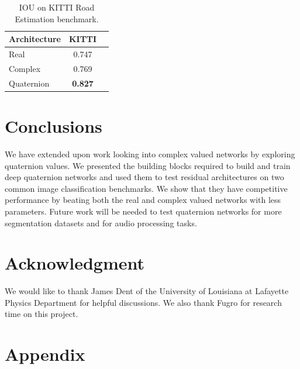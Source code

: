 \documentclass[conference]{IEEEtran}
\begin{document}
\begin{table}[h]
	\centering
		\begin{tabular}{l c c}
			\hline
			Architecture & KITTI \\
			\hline
			Real & 0.747 \\
			Complex & 0.769 \\
			Quaternion & \textbf{0.827}
		\end{tabular}
	\caption{IOU on KITTI Road Estimation benchmark.}
	\label{t:results2}
\end{table}


\section{Conclusions}
We have extended upon work looking into complex valued networks by exploring quaternion values.
We presented the building blocks required to build and train deep quaternion networks and used them to test residual architectures on two common image classification benchmarks.
We show that they have competitive performance by beating both the real and complex valued networks with less parameters.
Future work will be needed to test quaternion networks for more segmentation datasets and for audio processing tasks.


\section{Acknowledgment}
We would like to thank James Dent of the University of Louisiana at Lafayette Physics Department for helpful discussions.
We also thank Fugro for research time on this project.

{}


\section{Appendix}
\end{document}
